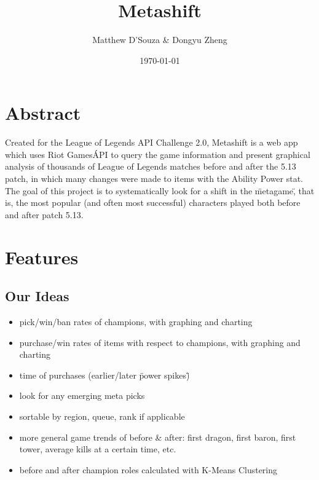 \documentclass{article}
\title{Metashift}
\date{\today}
\author{Matthew D'Souza \& Dongyu Zheng}
\begin{document}
\maketitle
{}

\newpage
\tableofcontents

\newpage
{}



\section{Abstract}

Created for the League of Legends API Challenge 2.0, Metashift is a web app which uses Riot Games\' API to query the game information and present graphical analysis of thousands of League of Legends matches before and after the 5.13 patch, in which many changes were made to items with the Ability Power stat. The goal of this project is to systematically look for a shift in the \"metagame\", that is, the most popular (and often most successful) characters played both before and after patch 5.13.


\section{Features}

\subsection{Our Ideas}
\begin{itemize}
    \item pick/win/ban rates of champions, with graphing and charting
    \item purchase/win rates of items with respect to champions, with graphing and charting
    \item time of purchases (earlier/later \"power spikes\")
    \item look for any emerging meta picks
    \item sortable by region, queue, rank if applicable
    \item more general game trends of before \& after: first dragon, first baron, first tower, average kills at a certain time, etc.
    \item before and after champion roles calculated with K-Means Clustering
\end{itemize}
\end{document}
